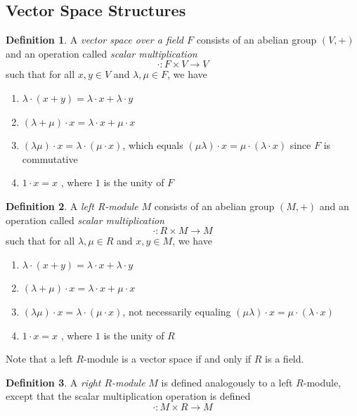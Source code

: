 \documentclass{article}
\theoremstyle{remark}
\theoremstyle{definition}
\newtheorem{definition}{Definition}[section]
\begin{document}
\subsection{Vector Space Structures}
\begin{definition}
 A \textit{vector space over a field $F$} consists of an abelian group $(V, +)$ and an operation called \textit{scalar multiplication} 
\[ \cdot: F \times V \rightarrow V \]
such that for all $x, y\in V$ and $\lambda, \mu \in F$, we have 
\begin{enumerate}
    \item $\lambda \cdot (x + y) = \lambda \cdot x + \lambda \cdot y$
    \item $(\lambda + \mu) \cdot x = \lambda \cdot x + \mu \cdot x$ 
    \item $(\lambda \mu) \cdot x = \lambda \cdot (\mu \cdot x )$, which equals $(\mu \lambda) \cdot x = \mu \cdot (\lambda \cdot x)$ since $F$ is commutative 
    \item $1 \cdot x = x$ , where $1$ is the unity of $F$
\end{enumerate}
\end{definition}

\begin{definition}
 A \textit{left R-module} $M$ consists of an abelian group $(M, +)$ and an operation called \textit{scalar multiplication}
\[ \cdot: R \times M \longrightarrow M \] 
such that for all $\lambda, \mu \in R$ and $x, y \in M$, we have 
\begin{enumerate}
    \item $\lambda \cdot (x + y) = \lambda \cdot x + \lambda \cdot y$
    \item $(\lambda + \mu) \cdot x = \lambda \cdot x + \mu \cdot x$ 
    \item $(\lambda \mu) \cdot x = \lambda \cdot (\mu \cdot x )$, not necessarily equaling $(\mu \lambda) \cdot x = \mu \cdot (\lambda \cdot x)$
    \item $1 \cdot x = x$ , where $1$ is the unity of $R$
\end{enumerate}
Note that a left $R$-module is a vector space if and only if $R$ is a field.
\end{definition}

\begin{definition}
A \textit{right $R$-module} $M$ is defined analogously to a left $R$-module, except that the scalar multiplication operation is defined
\[ \cdot: M \times R \longrightarrow M \]
\end{definition}
\end{document}
